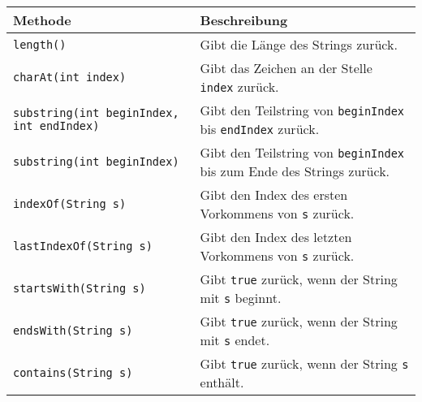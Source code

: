 \documentclass[a4paper, 12pt]{report}
\begin{document}
    \begin{tabularx}{\textwidth}{|X|X|}
        \hline
        \textbf{Methode}                                     & \textbf{Beschreibung}                                                                                                                     \\
        \hline
        \texttt{length()}                                    & Gibt die Länge des Strings zurück.                                                                                                        \\
        \hline
        \texttt{charAt(int index)}                           & Gibt das Zeichen an der Stelle \texttt{index} zurück.                                                                                     \\
        \hline
        \texttt{substring(int beginIndex, int endIndex)}     & Gibt den Teilstring von \texttt{beginIndex} bis \texttt{endIndex} zurück.                                                                 \\
        \hline
        \texttt{substring(int beginIndex)}                   & Gibt den Teilstring von \texttt{beginIndex} bis zum Ende des Strings zurück.                                                              \\
        \hline
        \texttt{indexOf(String s)}                           & Gibt den Index des ersten Vorkommens von \texttt{s} zurück.                                                                               \\
        \hline
        \texttt{lastIndexOf(String s)}                       & Gibt den Index des letzten Vorkommens von \texttt{s} zurück.                                                                              \\
        \hline
        \texttt{startsWith(String s)}                        & Gibt \texttt{true} zurück, wenn der String mit \texttt{s} beginnt.                                                                        \\
        \hline
        \texttt{endsWith(String s)}                          & Gibt \texttt{true} zurück, wenn der String mit \texttt{s} endet.                                                                          \\
        \hline
        \texttt{contains(String s)}                          & Gibt \texttt{true} zurück, wenn der String \texttt{s} enthält.                                                                            \\

\end{tabularx}
\end{document}
